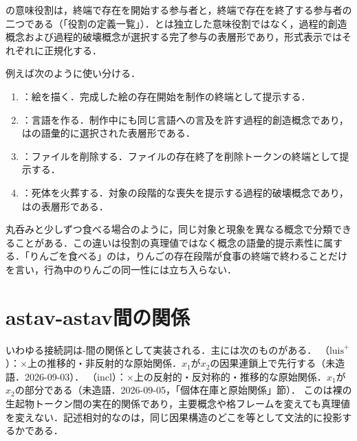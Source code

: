 \documentclass[../../main-detail.tex]{subfiles}
\begin{document}
の意味役割は，終端で存在を開始する参与者と，終端で存在を終了する参与者の二つである（「役割の定義一覧」）．とは独立した意味役割ではなく，過程的創造概念および過程的破壊概念が選択する完了参与の表層形であり，形式表示ではそれぞれに正規化する．
\begin{example}例えば次のように使い分ける．
\begin{enumerate}
    \item {}：絵を描く．完成した絵の存在開始を制作の終端として提示する．
    \item {}：言語を作る．制作中にも同じ言語への言及を許す過程的創造概念であり，はの語彙的に選択された表層形である．
    \item {}：ファイルを削除する．ファイルの存在終了を削除トークンの終端として提示する．
    \item {}：死体を火葬する．対象の段階的な喪失を提示する過程的破壊概念であり，はの表層形である．
\end{enumerate}
丸呑みと少しずつ食べる場合のように，同じ対象と現象を異なる概念で分類できることがある．この違いは役割の真理値ではなく概念の語彙的提示素性に属する．「りんごを食べる」のは，りんごの存在段階が食事の終端で終わることだけを言い，行為中のりんごの同一性には立ち入らない．
\end{example}

\section{astav-astav間の関係}
いわゆる接続詞は-間の関係として実装される．主には次のものがある．
（$\mathrm{luis}^{+}$）：$\times$上の推移的・非反射的な原始関係．$x_1$が$x_2$の因果連鎖上で先行する（未造語．2026-09-03）．
（$\mathrm{incl}$）：$\times$上の反射的・反対称的・推移的な原始関係．$x_1$が$x_2$の部分である（未造語．2026-09-05，「個体在庫と原始関係」節）．
このは裸の生起物トークン間の実在的関係であり，主要概念や格フレームを変えても真理値を変えない．記述相対的なのは，同じ因果構造のどこを等として文法的に投影するかである．
\end{document}
